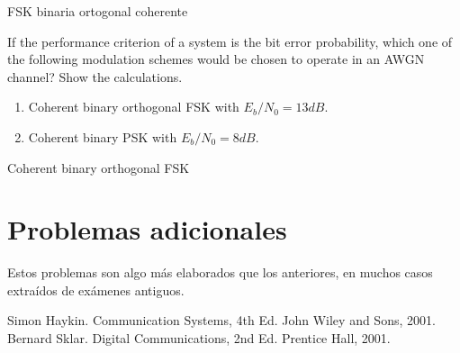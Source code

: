 \documentclass[es,boletin]{uah}
\begin{document}
{

FSK binaria ortogonal coherente
}
{

	\cite{Sklar} If the performance criterion of a system is the bit error probability, which one of the following modulation schemes would be chosen to operate in an AWGN channel? Show the calculations.

\begin{enumerate}
	\item Coherent binary orthogonal FSK with $E_b/N_0 = 13 dB$.
	\item Coherent binary PSK with $E_b/N_0 = 8 dB$.
\end{enumerate}

}
{

Coherent binary orthogonal FSK
}


\newpage
\section{Problemas adicionales}
Estos problemas son algo más elaborados que los anteriores, en muchos casos extraídos de exámenes antiguos.





\begin{thebibliography}{100}
	  Simon Haykin. Communication Systems, 4th Ed. John Wiley and Sons, 2001.
	 Bernard Sklar. Digital Communications, 2nd Ed. Prentice Hall, 2001.
	\end{thebibliography}
\end{document}
